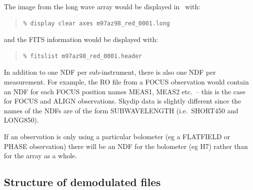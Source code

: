 \documentclass[twoside,11pt]{article}
\newcommand{\Kappa}{\xref{{\sc{Kappa}}}{sun95}{}}
\newenvironment{myquote}{\begin{quote}\begin{small}}{\end{small}\end{quote}}
\newcommand{\xref}[3]{#1}
\renewcommand{\_}{\texttt{\symbol{95}}}
\begin{document}
The image from the long wave array would be displayed in \Kappa\
with:
\begin{myquote}
\begin{verbatim}
% display clear axes m97az98_red_0001.long
\end{verbatim}
\end{myquote} 
and the FITS information would be displayed with:
\begin{myquote}
\begin{verbatim}
% fitslist m97az98_red_0001.header
\end{verbatim}
\end{myquote}

In addition to one NDF per sub-instrument, there is also one NDF per
measurement. For example, the RO file from a FOCUS observation would contain
an NDF for each FOCUS position names MEAS\_1, MEAS\_2 etc.\ -- this is the
case for FOCUS and ALIGN observations. Skydip data is slightly different 
since the names of the NDFs are of the form SUB\_WAVELENGTH (i.e.\ SHORT\_450
and LONG\_850).

If an observation is only using a particular bolometer (eg a FLATFIELD or
PHASE observation) there will be an NDF for the bolometer (eg H7) rather than
for the array as a whole.


\subsection{Structure of demodulated files\label{demodstruc}}
\end{document}

